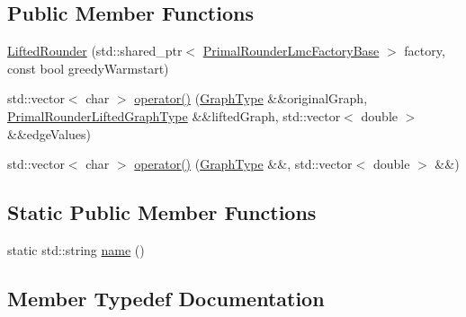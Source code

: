 \subsection*{Public Member Functions}
\begin{DoxyCompactItemize}
\item 
\hyperlink{structnifty_1_1graph_1_1optimization_1_1lifted__multicut_1_1LiftedMulticutMp_1_1LiftedRounder_a72b7e5f7d920c4d9802f3dc14080726b}{Lifted\+Rounder} (std\+::shared\+\_\+ptr$<$ \hyperlink{structnifty_1_1graph_1_1optimization_1_1lifted__multicut_1_1LiftedMulticutMp_1_1LiftedRounder_a2a73fd52a53cab7edd1d8f516f02a5ae}{Primal\+Rounder\+Lmc\+Factory\+Base} $>$ factory, const bool greedy\+Warmstart)
\item 
std\+::vector$<$ char $>$ \hyperlink{structnifty_1_1graph_1_1optimization_1_1lifted__multicut_1_1LiftedMulticutMp_1_1LiftedRounder_a195d1448ff9824601d6d574ccfe8fb77}{operator()} (\hyperlink{structnifty_1_1graph_1_1optimization_1_1lifted__multicut_1_1LiftedMulticutMp_1_1LiftedRounder_a91c69552853fcb3f4b4016f364f5a391}{Graph\+Type} \&\&original\+Graph, \hyperlink{structnifty_1_1graph_1_1optimization_1_1lifted__multicut_1_1LiftedMulticutMp_1_1LiftedRounder_a50c015dc6966b849a329b52feec65d06}{Primal\+Rounder\+Lifted\+Graph\+Type} \&\&lifted\+Graph, std\+::vector$<$ double $>$ \&\&edge\+Values)
\item 
std\+::vector$<$ char $>$ \hyperlink{structnifty_1_1graph_1_1optimization_1_1lifted__multicut_1_1LiftedMulticutMp_1_1LiftedRounder_a0954e859a605ad2db495f780c3c93e6f}{operator()} (\hyperlink{structnifty_1_1graph_1_1optimization_1_1lifted__multicut_1_1LiftedMulticutMp_1_1LiftedRounder_a91c69552853fcb3f4b4016f364f5a391}{Graph\+Type} \&\&, std\+::vector$<$ double $>$ \&\&)
\end{DoxyCompactItemize}
\subsection*{Static Public Member Functions}
\begin{DoxyCompactItemize}
\item 
static std\+::string \hyperlink{structnifty_1_1graph_1_1optimization_1_1lifted__multicut_1_1LiftedMulticutMp_1_1LiftedRounder_ac13fae083f1af2f3070439d54c26373f}{name} ()
\end{DoxyCompactItemize}


\subsection{Member Typedef Documentation}
\hypertarget{structnifty_1_1graph_1_1optimization_1_1lifted__multicut_1_1LiftedMulticutMp_1_1LiftedRounder_a91c69552853fcb3f4b4016f364f5a391}{}
